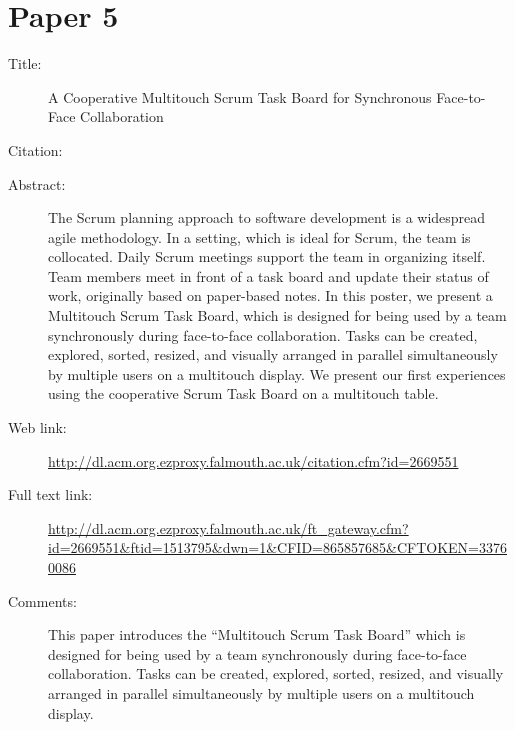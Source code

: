 \documentclass{scrartcl}
\begin{document}
\section*{Paper 5}
\begin{description}
\item[Title:] A Cooperative Multitouch Scrum Task Board for Synchronous Face-to-Face Collaboration
\item[Citation:] \cite{bibtex_key}
\item[Abstract:] The Scrum planning approach to software development is a widespread agile methodology. In a setting, which is ideal for Scrum, the team is collocated. Daily Scrum meetings support the team in organizing itself. Team members meet in front of a task board and update their status of work, originally based on paper-based notes. In this poster, we present a Multitouch Scrum Task Board, which is designed for being used by a team synchronously during face-to-face collaboration. Tasks can be created, explored, sorted, resized, and visually arranged in parallel simultaneously by multiple users on a multitouch display. We present our first experiences using the cooperative Scrum Task Board on a multitouch table.
\item[Web link:] \url{http://dl.acm.org.ezproxy.falmouth.ac.uk/citation.cfm?id=2669551}
\item[Full text link:] \url{http://dl.acm.org.ezproxy.falmouth.ac.uk/ft_gateway.cfm?id=2669551&ftid=1513795&dwn=1&CFID=865857685&CFTOKEN=33760086}
\item[Comments:] This paper introduces the “Multitouch Scrum Task Board” which is designed for being used by a team synchronously during face-to-face collaboration. Tasks can be created, explored, sorted, resized, and visually arranged in parallel simultaneously by multiple users on a multitouch display.
\end{description}
\end{document}
